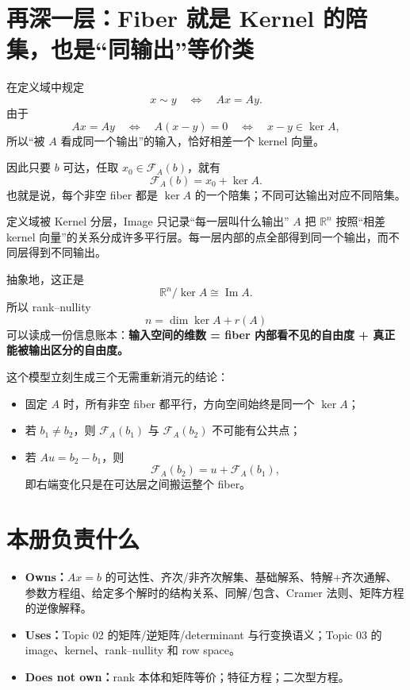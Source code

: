 \documentclass[11pt,a4paper]{ctexart}
\newcommand{\kw}[1]{\textbf{\color{deep}#1}}
\begin{document}
\section{再深一层：Fiber 就是 Kernel 的陪集，也是“同输出”等价类}

在定义域中规定
\[
x\sim y
\quad\Longleftrightarrow\quad
Ax=Ay.
\]
由于
\[
Ax=Ay
\quad\Longleftrightarrow\quad
A(x-y)=0
\quad\Longleftrightarrow\quad
x-y\in\ker A,
\]
所以“被 $A$ 看成同一个输出”的输入，恰好相差一个 kernel 向量。

因此只要 $b$ 可达，任取 $x_0\in\mathcal F_A(b)$，就有
\[
\boxed{\mathcal F_A(b)=x_0+\ker A.}
\]
也就是说，每个非空 fiber 都是 $\ker A$ 的一个陪集；不同可达输出对应不同陪集。

\begin{corebox}{定义域被 Kernel 分层，Image 只记录“每一层叫什么输出”}
$A$ 把 $\mathbb R^n$ 按照“相差 kernel 向量”的关系分成许多平行层。每一层内部的点全部得到同一个输出，而不同层得到不同输出。

抽象地，这正是
\[
\mathbb R^n/\ker A\cong\operatorname{Im}A.
\]
所以 rank--nullity
\[
n=\dim\ker A+r(A)
\]
可以读成一份信息账本：\kw{输入空间的维数 = fiber 内部看不见的自由度 + 真正能被输出区分的自由度。}
\end{corebox}

这个模型立刻生成三个无需重新消元的结论：
\begin{itemize}
  \item 固定 $A$ 时，所有非空 fiber 都平行，方向空间始终是同一个 $\ker A$；
  \item 若 $b_1\neq b_2$，则 $\mathcal F_A(b_1)$ 与 $\mathcal F_A(b_2)$ 不可能有公共点；
  \item 若 $Au=b_2-b_1$，则
  \[
  \mathcal F_A(b_2)=u+\mathcal F_A(b_1),
  \]
  即右端变化只是在可达层之间搬运整个 fiber。
\end{itemize}

\section{本册负责什么}

\begin{itemize}
  \item \kw{Owns：}$Ax=b$ 的可达性、齐次/非齐次解集、基础解系、特解+齐次通解、参数方程组、给定多个解时的结构关系、同解/包含、Cramer 法则、矩阵方程的逆像解释。
  \item \kw{Uses：}Topic 02 的矩阵/逆矩阵/determinant 与行变换语义；Topic 03 的 image、kernel、rank--nullity 和 row space。
  \item \kw{Does not own：}rank 本体和矩阵等价；特征方程；二次型方程。
\end{itemize}
\end{document}
